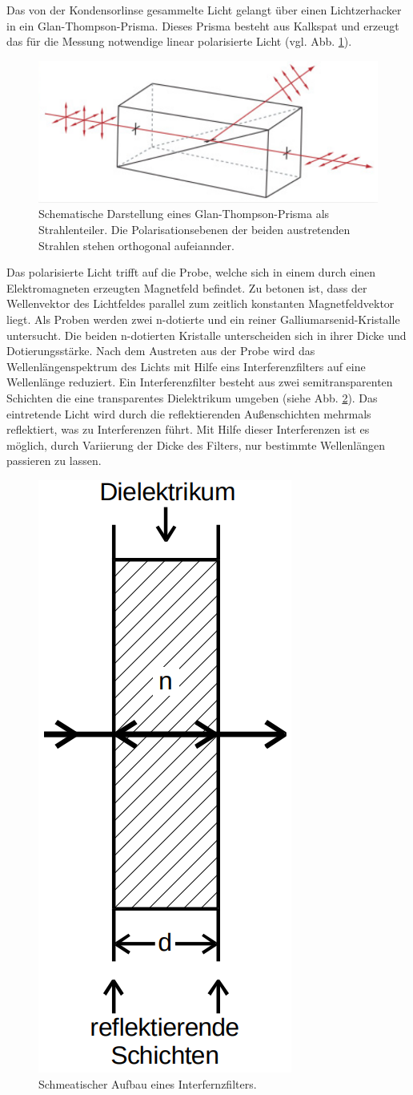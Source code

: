 Das von der Kondensorlinse gesammelte Licht gelangt über einen Lichtzerhacker in
ein Glan-Thompson-Prisma.
Dieses Prisma besteht aus Kalkspat und erzeugt das für die Messung notwendige linear polarisierte Licht (vgl. Abb. \ref{fig:glan_thompson_prisma}).
\begin{figure}
\centering
\includegraphics[width=0.5\linewidth]{./content/images/glan_thompson_prisma.png}
\caption{Schematische Darstellung eines Glan-Thompson-Prisma als Strahlenteiler.
Die Polarisationsebenen der beiden austretenden Strahlen stehen orthogonal aufeiannder.}
\label{fig:glan_thompson_prisma}
\end{figure}
Das polarisierte Licht trifft auf die Probe, welche sich in einem durch einen Elektromagneten erzeugten Magnetfeld befindet.
Zu betonen ist, dass der Wellenvektor des Lichtfeldes parallel zum zeitlich konstanten Magnetfeldvektor liegt.
Als Proben werden zwei n-dotierte und ein reiner Galliumarsenid-Kristalle untersucht.
Die beiden n-dotierten Kristalle unterscheiden sich in ihrer Dicke und Dotierungsstärke.
Nach dem Austreten aus der Probe wird das Wellenlängenspektrum des Lichts mit Hilfe
eins Interferenzfilters auf eine Wellenlänge reduziert.
Ein Interferenzfilter besteht aus zwei semitransparenten Schichten die eine transparentes Dielektrikum umgeben (siehe Abb. \ref{fig:interferenzfilter}).
Das eintretende Licht wird durch die reflektierenden
Außenschichten mehrmals reflektiert, was zu Interferenzen führt.
Mit Hilfe dieser Interferenzen ist es möglich, durch Variierung der
Dicke des Filters, nur bestimmte Wellenlängen passieren zu lassen.
\begin{figure}
\centering
\includegraphics[width=0.15\linewidth]{./content/images/interferenzfilter.png}
\caption{Schmeatischer Aufbau eines Interfernzfilters.}
\label{fig:interferenzfilter}
\end{figure}
